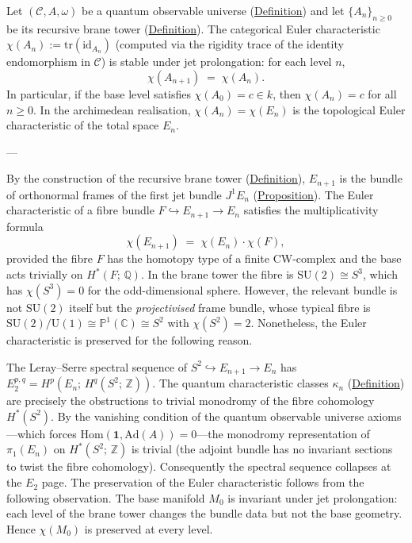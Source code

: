 \begin{proposition}
  \label{prop:euler-char-stability}
Let $(\mathcal{C}, A, \omega)$ be a quantum observable universe
(\hyperref[def:quantum-observable-universe]{Definition}) and let
$\{A_n\}_{n \geq 0}$ be its recursive brane tower
(\hyperref[def:recursive-brane-tower]{Definition}).  The categorical Euler
characteristic $\chi(A_n) := \mathrm{tr}(\mathrm{id}_{A_n})$ (computed
via the rigidity trace of the identity endomorphism in $\mathcal{C}$)
is stable under jet prolongation: for each level $n$,
\[
\chi(A_{n+1}) \;=\; \chi(A_n).
\]
In particular, if the base level satisfies $\chi(A_0) = c \in k$, then
$\chi(A_n) = c$ for all $n \geq 0$.  In the archimedean realisation,
$\chi(A_n) = \chi(E_n)$ is the topological Euler characteristic of the
total space $E_n$.

---

By the construction of the recursive brane tower
(\hyperref[def:recursive-brane-tower]{Definition}), $E_{n+1}$ is the bundle of
orthonormal frames of the first jet bundle $J^1 E_n$
(\hyperref[prop:jet-prolongation]{Proposition}).  The Euler characteristic of a
fibre bundle $F \hookrightarrow E_{n+1} \to E_n$ satisfies the
multiplicativity formula
\[
\chi(E_{n+1}) \;=\; \chi(E_n) \cdot \chi(F),
\]
provided the fibre $F$ has the homotopy type of a finite CW-complex and the
base acts trivially on $H^*(F;\, \mathbb{Q})$.  In the brane tower the fibre
is $\mathrm{SU}(2) \cong S^3$, which has $\chi(S^3) = 0$ for the odd-dimensional
sphere.  However, the relevant bundle is not $\mathrm{SU}(2)$ itself but the
\emph{projectivised} frame bundle, whose typical fibre is
$\mathrm{SU}(2)/\mathrm{U}(1) \cong \mathbb{P}^1(\mathbb{C}) \cong S^2$ with
$\chi(S^2) = 2$.  Nonetheless, the Euler characteristic is preserved for the
following reason.

The Leray--Serre spectral sequence of
$S^2 \hookrightarrow E_{n+1} \to E_n$ has $E_2^{p,q} = H^p(E_n;\,
H^q(S^2;\, \mathbb{Z}))$.  The quantum characteristic classes $\kappa_n$
(\hyperref[def:quantum-characteristic-classes]{Definition}) are precisely the
obstructions to trivial monodromy of the fibre cohomology $H^*(S^2)$.  By
the vanishing condition of the quantum observable universe axioms---which
forces $\mathrm{Hom}(\mathbf{1}, \mathrm{Ad}(A)) = 0$---the monodromy
representation of $\pi_1(E_n)$ on $H^*(S^2;\, \mathbb{Z})$ is trivial (the
adjoint bundle has no invariant sections to twist the fibre cohomology).
Consequently the spectral sequence collapses at the $E_2$ page.  The
preservation of the Euler characteristic follows from the following
observation.  The base manifold $M_0$ is invariant under jet prolongation:
each level of the brane tower changes the bundle data but not the base
geometry.  Hence $\chi(M_0)$ is preserved at every level.
\end{proposition}
